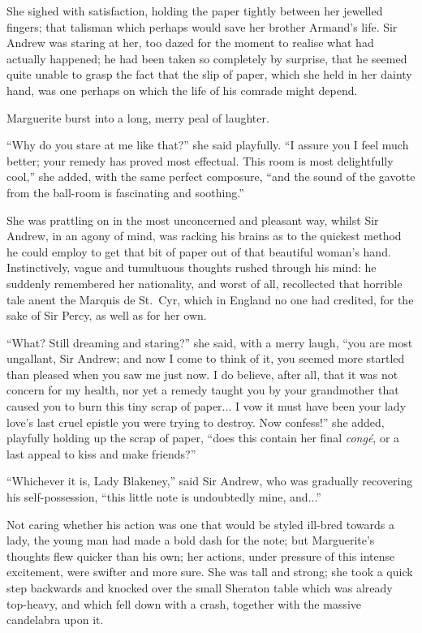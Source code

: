 \documentclass[paper=a5,BCOR=7mm,twoside,DIV=calc,12pt,usegeometry,chapterprefix,endperiod,headings=big]{scrbook}
\begin{document}
She sighed with satisfaction, holding the paper tightly between her jewelled fingers; that talisman which perhaps would save her brother Armand's life. Sir Andrew was staring at her, too dazed for the moment to realise what had actually happened; he had been taken so completely by surprise, that he seemed quite unable to grasp the fact that the slip of paper, which she held in her dainty hand, was one perhaps on which the life of his comrade might depend.

Marguerite burst into a long, merry peal of laughter.

\enquote{Why do you stare at me like that?} she said playfully. \enquote{I assure you I feel much better; your remedy has proved most effectual. This room is most delightfully cool,} she added, with the same perfect composure, \enquote{and the sound of the gavotte from the ball-room is fascinating and soothing.}

She was prattling on in the most unconcerned and pleasant way, whilst Sir Andrew, in an agony of mind, was racking his brains as to the quickest method he could employ to get that bit of paper out of that beautiful woman's hand. Instinctively, vague and tumultuous thoughts  rushed through his mind: he suddenly remembered her nationality, and worst of all, recollected that horrible tale anent the Marquis de St.~Cyr, which in England no one had credited, for the sake of Sir Percy, as well as for her own.

\enquote{What? Still dreaming and staring?} she said, with a merry laugh, \enquote{you are most ungallant, Sir Andrew; and now I come to think of it, you seemed more startled than pleased when you saw me just now. I do believe, after all, that it was not concern for my health, nor yet a remedy taught you by your grandmother that caused you to burn this tiny scrap of paper... I vow it must have been your lady love's last cruel epistle you were trying to destroy. Now confess!} she added, playfully holding up the scrap of paper, \enquote{does this contain her final \textit{congé}, or a last appeal to kiss and make friends?}

\enquote{Whichever it is, Lady Blakeney,} said Sir Andrew, who was gradually recovering his self-possession, \enquote{this little note is undoubtedly mine, and...}

Not caring whether his action was one that would be styled ill-bred towards a lady, the young man had made a bold dash for the note; but Marguerite's thoughts flew quicker than his own; her actions, under pressure of this intense excitement, were swifter and more sure. She was tall and strong; she took a quick step backwards and knocked over the small Sheraton table which was already top-heavy, and which fell down with a crash, together with the massive candelabra upon it.
\end{document}
